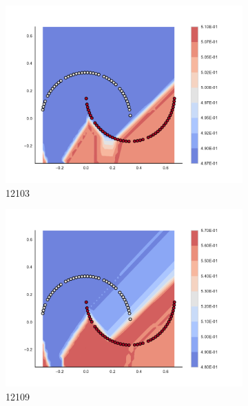 \begin{figure}[h]
\begin{subfigure}[b]{0.09\textwidth}
    \includegraphics[clip, trim=2.35cm 1.75cm 4.5cm 0cm,width=\textwidth]{img/convergence/12103.pdf}
    \caption{12103}
    \label{fig:convergence_12103}
\end{subfigure}
%
\begin{subfigure}[b]{0.09\textwidth}
    \includegraphics[clip, trim=2.35cm 1.75cm 4.5cm 0cm,width=\textwidth]{img/convergence/12109.pdf}
    \caption{12109}
    \label{fig:convergence_12109}
\end{subfigure}
%
\begin{subfigure}[b]{0.09\textwidth}

\end{subfigure}
\end{figure}
